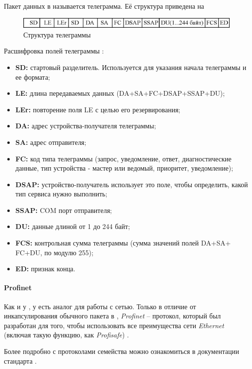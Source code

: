 Пакет данных в \pb называется телеграмма. Её структура приведена на 
\begin{figure}
	\centering
	\includegraphics[width=\linewidth]{images/profibus_tg}
	\caption{Структура телеграммы \pb}
	\label{fig:profibustg}
\end{figure}
Расшифровка полей телеграммы \cite{__2015, acromag_introduction_2002}:
\begin{itemize}
	\item \textbf{SD:} стартовый разделитель. Используется для указания начала телеграммы и ее формата;
	\item \textbf{LE:} длина передаваемых данных (DA+SA+FC+DSAP+SSAP+DU);
	\item \textbf{LEr:} повторение поля LE с целью его резервирования;
	\item \textbf{DA:} адрес устройства-получателя телеграммы;
	\item \textbf{SA:} адрес отправителя;
	\item \textbf{FC:} код типа телеграммы (запрос, уведомление, ответ, диагностические данные, тип устройства - мастер или ведомый, приоритет, уведомление);
	\item \textbf{DSAP:} устройство-получатель использует это поле, чтобы определить, какой тип сервиса нужно выполнить;
	\item \textbf{SSAP:} COM порт отправителя;
	\item \textbf{DU:} данные длиной от 1 до 244 байт;
	\item \textbf{FCS:} контрольная сумма телеграммы (сумма значений полей DA+SA+ FC+DU, по модулю 255);
	\item \textbf{ED:} признак конца.
\end{itemize} 

\paragraph{Profinet}
Как и у \mb, у \pb есть аналог для работы с сетью. Только в отличие от инкапсулирования обычного пакета в \tcp, \textit{Profinet} -- протокол, который был разработан для того, чтобы использовать все преимущества сети \textit{Ethernet} (включая такую функцию, как \textit{Profisafe}) \cite{powell_profibus_2013}.

Более подробно с протоколами семейства \pb можно ознакомиться в документации стандарта \cite{acromag_introduction_2002}.